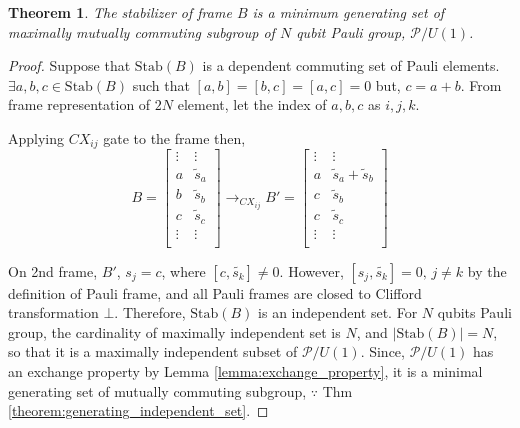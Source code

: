 \documentclass[a4paper,12pt]{article}
\newtheorem{theorem}{Theorem}
\begin{document}
\begin{theorem}
    The stabilizer of frame $B$ is a minimum generating set of maximally mutually commuting subgroup of $N$ qubit Pauli group, $\mathcal{P}/U(1)$.
\end{theorem}
\begin{proof}
    Suppose that $\mbox{Stab}(B)$ is a dependent commuting set of Pauli elements.
    $\exists a, b, c \in \mbox{Stab}(B)$ such that $[a,b] = [b,c] = [a,c] = 0$ but, $c = a+b$.
    From frame representation of $2N$ element, let the index of $a, b, c$ as $i, j, k$.

    Applying $CX_{ij}$ gate to the frame then, 
    \begin{equation*}
        B = \begin{bmatrix}
            \vdots & \vdots\\
            a & \tilde{s}_a\\
            b & \tilde{s}_b\\
            c & \tilde{s}_c\\
            \vdots & \vdots\\
        \end{bmatrix}
        \rightarrow_{CX _{ij}}
        B' = \begin{bmatrix}
            \vdots & \vdots\\
            a & \tilde{s}_a + \tilde{s}_b\\
            c & \tilde{s}_b\\
            c & \tilde{s}_c\\
            \vdots & \vdots\\
        \end{bmatrix}
    \end{equation*}

    On 2nd frame, $B'$, $s_j = c$, where $[c, \tilde{s_k}] \neq 0 $. 
    However, $[s_j, \tilde{s_k}] =0, \, j\neq k$ by the definition of Pauli frame, and all Pauli frames are closed to Clifford transformation $\bot$. 
    Therefore, $\mbox{Stab}(B)$ is an independent set.
    For $N$ qubits Pauli group, the cardinality of maximally independent set is $N$,
    and $|\mbox{Stab}(B)|=N$, so that it is a maximally independent subset of $\mathcal{P}/U(1)$.
    Since, $\mathcal{P}/U(1)$ has an exchange property by Lemma \ref{lemma:exchange_property}, it is a minimal generating set of mutually commuting subgroup, $\because $ Thm \ref{theorem:generating_independent_set}.
\end{proof}
\end{document}
